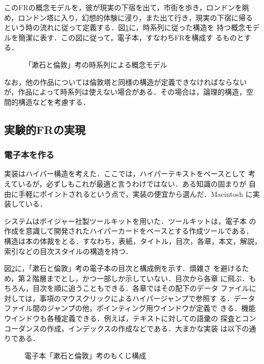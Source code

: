 このFRの概念モデルを，彼が現実の下宿を出て，市街を歩き，ロンドンを眺
め，ロンドン塔に入り，幻想的体験に浸り，また出て行き，現実の下宿に帰る
という時の流れに従って定義する．図\ref{fig:6}に，時系列に従った構造を
持つ概念モデルを簡潔に表す．この図に従って，電子本，すなわちFRを構成す
るものとする．

\begin{figure}[htbp]
\begin{center}
  
  \caption{「漱石と倫敦」考の時系列による概念モデル}\label{fig:6}
\end{center}
\end{figure}

なお，他の作品については倫敦塔と同様の構造が定義できなければならない
が，作品によって時系列は使えない場合がある．その場合は，論理的構造，空
間的構造などを考慮する．
 
\subsection{実験的FRの実現}
\subsubsection{電子本を作る}
実装はハイパー構造を考えた．ここでは，ハイパーテキストをベースとして
考えているが，必ずしもこれが最適と言うわけではない．ある知識の固まりが
自由に手軽にポイントされるという点で，実装の便宜から選んだ．Macintosh 
に実装している．

システムはボイジャー社製ツールキットを用いた．ツールキットは，電子本
の作成を意識して開発されたハイパーカードをベースとする作成ツールである．
構造は本の体裁をとる．すなわち，表紙，タイトル，目次，各章，本文，解説，
索引などの目次スタイルの構造を持つ．

図\ref{fig:7}に，「漱石と倫敦」考の電子本の目次と構成例を示す．煩雑さ
を避けるため，第２階層までとし，かつ一部しか示していない．目次から各章
に飛ぶ．もちろん，目次を順に追うこともできる．各章ではその配下のデータ
ファイルに対しては，事項のマウスクリックによるハイパージャンプで参照す
る．データファイル間のジャンプの他，ポインティング用ウインドウが定義で
きる．機能ウインドウも各種定義できる．例えば，テキストに対しての語彙の
探査とコンコーダンスの作成，インデックスの作成などである．大まかな実装
は以下の通りである．

\begin{figure}[htb]
\begin{center}
  
  \caption{電子本「漱石と倫敦」考のもくじ構成}\label{fig:7}
\end{center}
\end{figure}

